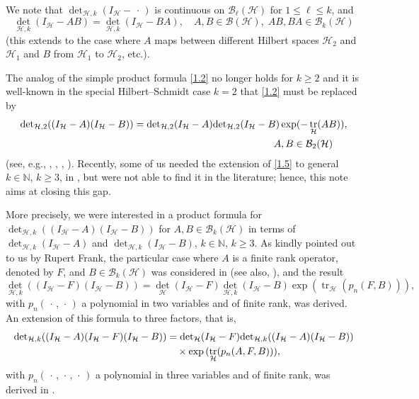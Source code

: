 \documentclass[reqno,10pt,centertags]{amsart}
\newcommand{\bbN}{{\mathbb{N}}}
\newcommand{\cB}{{\mathcal B}}
\newcommand{\cH}{{\mathcal H}}
\DeclareMathOperator{\tr}{tr}
\newcommand{\dott}{\,\cdot\,}
\newcommand{\no}{\notag}
\newcommand{\lb}{\label}
\let\geq\geqslant
\let\leq\leqslant
\numberwithin{equation}{section}
\theoremstyle{remark}
\begin{document}
We note that ${\det}_{\cH,k}(I_{\cH} - \dott)$ is continuous on $\cB_{\ell}(\cH)$ for $1 \leq \ell \leq k$, and 
\begin{equation}
{\det}_{\cH,k} (I_{\cH} - AB) = {\det}_{\cH,k} (I_{\cH} - BA),   \quad A, B \in \cB(\cH), \; AB, BA \in \cB_k(\cH)  
\lb{1.4} 
\end{equation}
(this extends to the case where $A$ maps between different Hilbert spaces $\cH_2$ and $\cH_1$ and $B$ from $\cH_1$ to 
$\cH_2$, etc.). 

The analog of the simple product formula \eqref{1.2} no longer holds for $k \geq 2$ and it is well-known in the special Hilbert--Schmidt case $k=2$ that \eqref{1.2} must be replaced by 
\begin{align}
& {\det}_{\cH,2} ((I_{\cH} - A) (I_{\cH} - B)) = {\det}_{\cH,2} (I_{\cH} - A) {\det}_{\cH,2} (I_{\cH} - B) 
\exp(- \tr_{\cH}(AB)),    \no \\
& \hspace*{9cm} A, B \in \cB_2(\cH)     \lb{1.5}
\end{align}
(see, e.g., \cite[p.~169]{GK69}, \cite[p.~76]{Si05}, \cite[p.~190]{Si15}, \cite[p.~44]{Ya92}). Recently, some of us needed the extension of \eqref{1.5} to general $k \in \bbN$, $k \geq 3$, in \cite{CGLNSZ20}, but were not able to find it in the literature; hence, this note aims at closing this gap. 

More precisely, we were interested in a product formula for ${\det}_{\cH,k} ((I_{\cH} - A) (I_{\cH} - B))$ for $A,B \in \cB_k(\cH)$ in terms of 
${\det}_{\cH,k} (I_{\cH} - A)$ and ${\det}_{\cH,k} (I_{\cH} - B)$, $k \in \bbN$, $k \geq 3$. As kindly pointed out to us by Rupert Frank, the particular case where $A$ is a finite rank operator, denoted by $F$, and $B \in \cB_k(\cH)$ was considered in 
\cite[Lemma~1.5.10]{Ha05} (see also, \cite[Proposition~4.8\,$(ii)$]{Ha16}), and the result
\begin{equation}
{\det}_{\cH,k} ((I_{\cH} - F) (I_{\cH} - B)) = {\det}_{\cH} (I_{\cH} - F) {\det}_{\cH,k} (I_{\cH} - B)    
\exp{(\tr_{\cH}(p_n(F,B)))},     \lb{1.6}
\end{equation}
with $p_n(\dott,\dott)$ a polynomial in two variables and of finite rank, was derived. An extension of this formula to three factors, that is, 
\begin{align}
{\det}_{\cH,k} ((I_{\cH} - A)(I_{\cH} - F) (I_{\cH} - B)) &= {\det}_{\cH} (I_{\cH} - F) 
{\det}_{\cH,k} ((I_{\cH} - A)(I_{\cH} - B))    \no \\
& \quad \times \exp{(\tr_{\cH}(p_n(A,F,B)))},     \lb{1.7} 
\end{align}
with $p_n(\dott,\dott,\dott)$ a polynomial in three variables and of finite rank, was derived in \cite[Lemma~C.1]{Fr17}.
\end{document}
